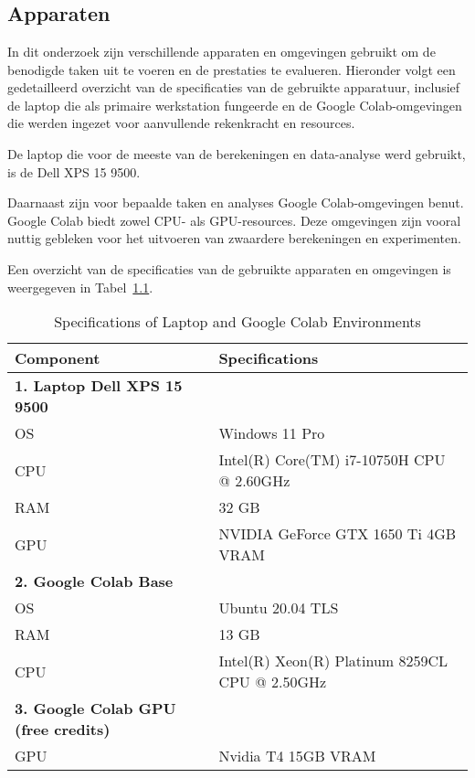 
\chapter{}%
\label{ch:proof of concept}

\section{Apparaten}
In dit onderzoek zijn verschillende apparaten en omgevingen gebruikt om de benodigde taken uit te voeren en de prestaties te evalueren. Hieronder volgt een gedetailleerd overzicht van de specificaties van de gebruikte apparatuur, inclusief de laptop die als primaire werkstation fungeerde en de Google Colab-omgevingen die werden ingezet voor aanvullende rekenkracht en resources.

De laptop die voor de meeste van de berekeningen en data-analyse werd gebruikt, is de Dell XPS 15 9500. 

Daarnaast zijn voor bepaalde taken en analyses Google Colab-omgevingen benut. Google Colab biedt zowel CPU- als GPU-resources. Deze omgevingen zijn vooral nuttig gebleken voor het uitvoeren van zwaardere berekeningen en experimenten.

Een overzicht van de specificaties van de gebruikte apparaten en omgevingen is weergegeven in Tabel~\ref{tab:specs}.

\begin{table}[H]
    \centering
    \begin{tabular}{|l|l|}
        \hline
        \textbf{Component} & \textbf{Specifications} \\ \hline
        \textbf{1. Laptop Dell XPS 15 9500} & \\
        \quad OS & Windows 11 Pro \\
        \quad CPU & Intel(R) Core(TM) i7-10750H CPU @ 2.60GHz \\
        \quad RAM & 32 GB \\
        \quad GPU & NVIDIA GeForce GTX 1650 Ti 4GB VRAM \\ \hline
        \textbf{2. Google Colab Base} & \\
        \quad OS & Ubuntu 20.04 TLS \\
        \quad RAM & 13 GB \\
        \quad CPU & Intel(R) Xeon(R) Platinum 8259CL CPU @ 2.50GHz \\ \hline
        \textbf{3. Google Colab GPU (free credits)} & \\
        \quad GPU & Nvidia T4 15GB VRAM \\ \hline
    \end{tabular}
    \caption{Specifications of Laptop and Google Colab Environments}
    \label{tab:specs}
\end{table}

